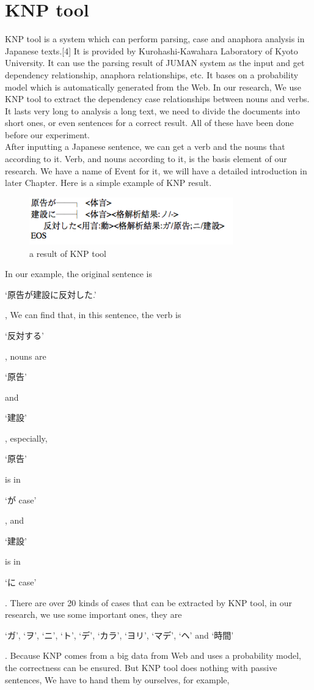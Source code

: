 \section{KNP tool}
KNP tool is a system which can perform parsing, case and anaphora analysis in Japanese texts.[4] It is provided by Kurohashi-Kawahara Laboratory of Kyoto University. It can use the parsing result of JUMAN system as the input and get dependency relationship, anaphora relationships, etc. It bases on a probability model which is automatically generated from the Web. In our research, We use KNP tool to extract the dependency case relationships between nouns and verbs. It lasts very long to analysis a long text, we need to divide the documents into short ones, or even sentences for a correct result. All of these have been done before our experiment. \\
After inputting a Japanese sentence, we can get a verb and the nouns that according to it. Verb, and nouns according to it, is the basis element of our research. We have a name of Event for it, we will have a detailed introduction in later Chapter. Here is a simple example of KNP result.\\
\begin{figure}[!h]
\centering
\includegraphics[width=250pt]{./pictures/0202.png}
\caption{a result of KNP tool}
\end{figure}
In our example, the original sentence is \begin{CJK}{UTF8}{ipxm}`原告が建設に反対した.'\end{CJK}, We can find that, in this sentence, the verb is \begin{CJK}{UTF8}{ipxm}`反対する'\end{CJK}, nouns are \begin{CJK}{UTF8}{ipxm}`原告'\end{CJK} and \begin{CJK}{UTF8}{ipxm}`建設'\end{CJK}, especially, \begin{CJK}{UTF8}{ipxm}`原告'\end{CJK} is in \begin{CJK}{UTF8}{ipxm}`が case'\end{CJK}, and \begin{CJK}{UTF8}{ipxm}`建設'\end{CJK} is in \begin{CJK}{UTF8}{ipxm}`に case'\end{CJK}. There are over 20 kinds of cases that can be extracted by KNP tool, in our research, we use some important ones, they are \begin{CJK}{UTF8}{ipxm}`ガ', `ヲ', `ニ', `ト', `デ', `カラ', `ヨリ', `マデ', `ヘ' and `時間'\end{CJK}. Because KNP comes from a big data from Web and uses a probability model, the correctness can be ensured. But KNP tool does nothing with passive sentences, We have to hand them by ourselves, for example, \\
